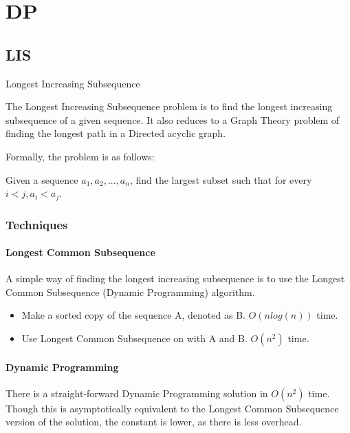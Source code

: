 \documentclass[a4paper, 11pt, oneside]{report}
\begin{document}
\chapter{DP}

\section{LIS}

Longest Increasing Subsequence


The Longest Increasing Subsequence problem is to find the longest increasing subsequence of a given sequence. It also reduces to a Graph Theory problem of finding the longest path in a Directed acyclic graph.

Formally, the problem is as follows:

Given a sequence $a_{1}, a_{2}, ..., a_{n}$, find the largest subset such that for every $i < j, a_{i} < a_{j}$.

\subsection*{Techniques}

\subsubsection{Longest Common Subsequence}

A simple way of finding the longest increasing subsequence is to use the Longest Common Subsequence (Dynamic Programming) algorithm.

\begin{itemize}

	\item Make a sorted copy of the sequence A, denoted as B. $O(nlog(n))$ time.
	
	\item Use Longest Common Subsequence on with A and B. $O(n^2)$ time.

\end{itemize}

\subsubsection*{Dynamic Programming}

There is a straight-forward Dynamic Programming solution in $O(n^2)$ time. Though this is asymptotically equivalent to the Longest Common Subsequence version of the solution, the constant is lower, as there is less overhead.
\end{document}

